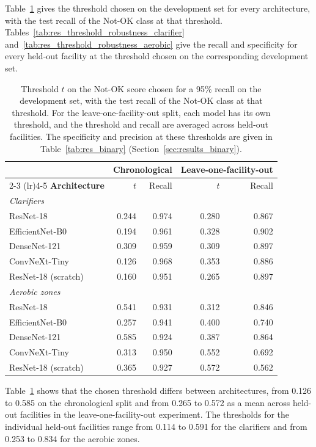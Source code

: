 Table~\ref{tab:res_threshold} gives the threshold chosen on the development set for every architecture, with the test recall of the Not-OK class at that threshold. Tables~\ref{tab:res_threshold_robustness_clarifier} and~\ref{tab:res_threshold_robustness_aerobic} give the recall and specificity for every held-out facility at the threshold chosen on the corresponding development set.

\begin{table}[htbp]
\centering
\setlength{\tabcolsep}{4pt}
\caption{Threshold $t$ on the Not-OK score chosen for a 95\% recall on the development set, with the test recall of the Not-OK class at that threshold. For the leave-one-facility-out split, each model has its own threshold, and the threshold and recall are averaged across held-out facilities. The specificity and precision at these thresholds are given in Table~\ref{tab:res_binary} (Section~\ref{sec:results_binary}).}
\label{tab:res_threshold}
\begin{tabular}{l rr rr}
\toprule
& \multicolumn{2}{c}{\textbf{Chronological}} & \multicolumn{2}{c}{\textbf{Leave-one-facility-out}} \\
\cmidrule(lr){2-3} \cmidrule(lr){4-5}
\textbf{Architecture} & $t$ & Recall & $t$ & Recall \\
\midrule
\multicolumn{5}{l}{\textit{Clarifiers}} \\
ResNet-18 & 0.244 & 0.974 & 0.280 & 0.867 \\
EfficientNet-B0 & 0.194 & 0.961 & 0.328 & 0.902 \\
DenseNet-121 & 0.309 & 0.959 & 0.309 & 0.897 \\
ConvNeXt-Tiny & 0.126 & 0.968 & 0.353 & 0.886 \\
ResNet-18 (scratch) & 0.160 & 0.951 & 0.265 & 0.897 \\
\midrule
\multicolumn{5}{l}{\textit{Aerobic zones}} \\
ResNet-18 & 0.541 & 0.931 & 0.312 & 0.846 \\
EfficientNet-B0 & 0.257 & 0.941 & 0.400 & 0.740 \\
DenseNet-121 & 0.585 & 0.924 & 0.387 & 0.864 \\
ConvNeXt-Tiny & 0.313 & 0.950 & 0.552 & 0.692 \\
ResNet-18 (scratch) & 0.365 & 0.927 & 0.572 & 0.562 \\
\bottomrule
\end{tabular}
\end{table}

Table~\ref{tab:res_threshold} shows that the chosen threshold differs between architectures, from 0.126 to 0.585 on the chronological split and from 0.265 to 0.572 as a mean across held-out facilities in the leave-one-facility-out experiment. The thresholds for the individual held-out facilities range from 0.114 to 0.591 for the clarifiers and from 0.253 to 0.834 for the aerobic zones.

